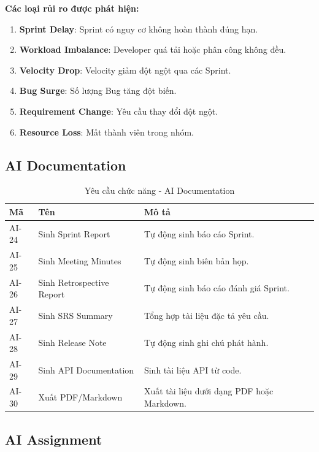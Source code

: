 \documentclass[12pt,a4paper]{report}
\begin{document}
\textbf{Các loại rủi ro được phát hiện:}

\begin{enumerate}
\item \textbf{Sprint Delay}: Sprint có nguy cơ không hoàn thành đúng hạn.
\item \textbf{Workload Imbalance}: Developer quá tải hoặc phân công không đều.
\item \textbf{Velocity Drop}: Velocity giảm đột ngột qua các Sprint.
\item \textbf{Bug Surge}: Số lượng Bug tăng đột biến.
\item \textbf{Requirement Change}: Yêu cầu thay đổi đột ngột.
\item \textbf{Resource Loss}: Mất thành viên trong nhóm.
\end{enumerate}

\subsection{AI Documentation}

\begin{table}[H]
\centering
\caption{Yêu cầu chức năng - AI Documentation}
\begin{tabular}{|p{2.5cm}|p{3.5cm}|p{8cm}|}
\hline
\textbf{Mã} & \textbf{Tên} & \textbf{Mô tả} \\
\hline
AI-24 & Sinh Sprint Report & Tự động sinh báo cáo Sprint. \\
\hline
AI-25 & Sinh Meeting Minutes & Tự động sinh biên bản họp. \\
\hline
AI-26 & Sinh Retrospective Report & Tự động sinh báo cáo đánh giá Sprint. \\
\hline
AI-27 & Sinh SRS Summary & Tổng hợp tài liệu đặc tả yêu cầu. \\
\hline
AI-28 & Sinh Release Note & Tự động sinh ghi chú phát hành. \\
\hline
AI-29 & Sinh API Documentation & Sinh tài liệu API từ code. \\
\hline
AI-30 & Xuất PDF/Markdown & Xuất tài liệu dưới dạng PDF hoặc Markdown. \\
\hline
\end{tabular}
\label{tab:ai_documentation_requirements}
\end{table}

\subsection{AI Assignment}
\end{document}
